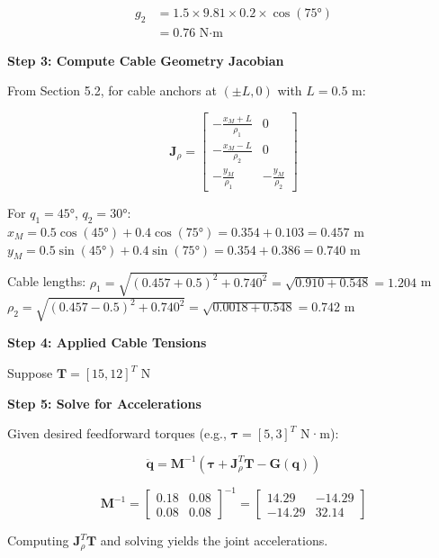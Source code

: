 \begin{align}
g_2 &= 1.5 \times 9.81 \times 0.2 \times \cos(75°) \\
&= 0.76 \text{ N·m}
\end{align}

\textbf{Step 3: Compute Cable Geometry Jacobian}

From Section 5.2, for cable anchors at $(±L, 0)$ with $L = 0.5$ m:

\begin{equation}
\mathbf{J}_{\rho} = \begin{bmatrix}
-\frac{x_M + L}{\rho_1} & 0 \\
-\frac{x_M - L}{\rho_2} & 0 \\
-\frac{y_M}{\rho_1} & -\frac{y_M}{\rho_2}
\end{bmatrix}
\end{equation}

For $q_1 = 45°$, $q_2 = 30°$:
$x_M = 0.5\cos(45°) + 0.4\cos(75°) = 0.354 + 0.103 = 0.457$ m
$y_M = 0.5\sin(45°) + 0.4\sin(75°) = 0.354 + 0.386 = 0.740$ m

Cable lengths:
$\rho_1 = \sqrt{(0.457+0.5)^2 + 0.740^2} = \sqrt{0.910 + 0.548} = 1.204$ m
$\rho_2 = \sqrt{(0.457-0.5)^2 + 0.740^2} = \sqrt{0.0018 + 0.548} = 0.742$ m

\textbf{Step 4: Applied Cable Tensions}

Suppose $\mathbf{T} = [15, 12]^T$ N

\textbf{Step 5: Solve for Accelerations}

Given desired feedforward torques (e.g., $\boldsymbol{\tau} = [5, 3]^T$ N·m):

\begin{equation}
\ddot{\mathbf{q}} = \mathbf{M}^{-1} \left( \boldsymbol{\tau} + \mathbf{J}_{\rho}^T \mathbf{T} - \mathbf{G}(\mathbf{q}) \right)
\end{equation}

\begin{equation}
\mathbf{M}^{-1} = \begin{bmatrix}
0.18 & 0.08 \\
0.08 & 0.08
\end{bmatrix}^{-1} = \begin{bmatrix}
14.29 & -14.29 \\
-14.29 & 32.14
\end{bmatrix}
\end{equation}

Computing $\mathbf{J}_{\rho}^T \mathbf{T}$ and solving yields the joint accelerations.

